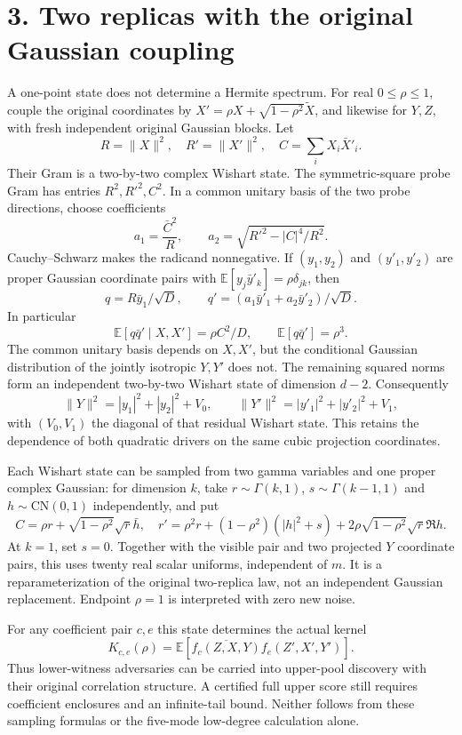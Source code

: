 \documentclass[11pt]{article}
\newcommand{\E}{\mathbb E}
\newcommand{\CN}{\mathrm{CN}}
\begin{document}
\section*{3. Two replicas with the original Gaussian coupling}
A one-point state does not determine a Hermite spectrum. For real
$0\le\rho\le1$, couple the original coordinates by
$X'=\rho X+\sqrt{1-\rho^2}\widetilde X$, and likewise for $Y,Z$, with fresh
independent original Gaussian blocks. Let
\[
 R=\|X\|^2,\quad R'=\|X'\|^2,\quad C=\sum_iX_i\bar X'_i.
\]
Their Gram is a two-by-two complex Wishart state. The symmetric-square probe
Gram has entries $R^2,R'^2,C^2$. In a common unitary basis of the two probe
directions, choose coefficients
\[
 a_1=\frac{\bar C^2}{R},\qquad
 a_2=\sqrt{R'^2-|C|^4/R^2}.
\]
Cauchy--Schwarz makes the radicand nonnegative. If
$(y_1,y_2)$ and $(y'_1,y'_2)$ are proper Gaussian coordinate pairs with
$\E[y_j\bar y'_k]=\rho\delta_{jk}$, then
\[
 q=R\bar y_1/\sqrt D,\qquad
 q'=(a_1\bar y'_1+a_2\bar y'_2)/\sqrt D.
\]
In particular
\[
 \E[q\bar q'\mid X,X']=\rho C^2/D,\qquad
 \E[q\bar q']=\rho^3.
\]
The common unitary basis depends on $X,X'$, but the conditional Gaussian
distribution of the jointly isotropic $Y,Y'$ does not. The remaining squared
norms form an independent two-by-two Wishart state of dimension $d-2$.
Consequently
\[
 \|Y\|^2=|y_1|^2+|y_2|^2+V_0,\qquad
 \|Y'\|^2=|y'_1|^2+|y'_2|^2+V_1,
\]
with $(V_0,V_1)$ the diagonal of that residual Wishart state. This retains the
dependence of both quadratic drivers on the same cubic projection coordinates.

Each Wishart state can be sampled from two gamma variables and one proper
complex Gaussian: for dimension $k$, take $r\sim\Gamma(k,1)$,
$s\sim\Gamma(k-1,1)$ and $h\sim\CN(0,1)$ independently, and put
\[
 C=\rho r+\sqrt{1-\rho^2}\sqrt r\bar h,
\quad
 r'=\rho^2r+(1-\rho^2)(|h|^2+s)
       +2\rho\sqrt{1-\rho^2}\sqrt r\Re h.
\]
At $k=1$, set $s=0$. Together with the visible pair and two projected $Y$
coordinate pairs, this uses twenty real scalar uniforms, independent of $m$.
It is a reparameterization of the original two-replica law, not an independent
Gaussian replacement. Endpoint $\rho=1$ is interpreted with zero new noise.

For any coefficient pair $c,e$ this state determines the actual kernel
\[
 K_{c,e}(\rho)=\E[\overline{f_c(Z,X,Y)}f_e(Z',X',Y')].
\]
Thus lower-witness adversaries can be carried into upper-pool discovery with
their original correlation structure. A certified full upper score still
requires coefficient enclosures and an infinite-tail bound. Neither follows
from these sampling formulas or the five-mode low-degree calculation alone.
\end{document}
